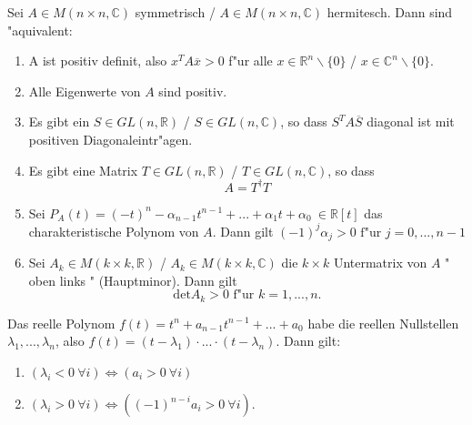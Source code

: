 \documentclass[8pt, a4paper, twocolumn, landscape]{article}
\newcommand{\comment}[1]{}
\begin{document}
\begin{theorem}
Sei $A \in M (n \times n, \mathbb{C})$ symmetrisch /  $A \in M (n \times n, \mathbb{C})$ hermitesch. Dann sind "aquivalent:
\begin{enumerate}
\item A ist positiv definit, also $x^TA\overline{x} > 0$ f"ur alle $x \in \mathbb{R}^n \backslash \{0\}$ /  $x \in \mathbb{C}^n\backslash \{0\}$.
\item Alle Eigenwerte von $A$ sind positiv.
\item Es gibt ein $S \in GL(n, \mathbb{R})$ / $S \in GL(n, \mathbb{C})$, so dass $S^TA\overline{S}$ diagonal ist mit positiven Diagonaleintr"agen.
\item Es gibt eine Matrix $T \in GL(n, \mathbb{R})$ / $T \in GL(n, \mathbb{C})$, so dass
$$
A = T^\dagger T
$$
\item Sei $P_A(t) = (-t)^n - \alpha_{n-1}t^{n-1} + ... + \alpha_1 t + \alpha_0 \ \in \mathbb{R} [t]$ das charakteristische Polynom von $A$. Dann gilt 
$
(-1)^j\alpha_j > 0 \text{ f"ur } j = 0, ..., n-1
$
\item Sei $A_k  \in M(k \times k, \mathbb{R})$ / $A_k  \in M(k \times k, \mathbb{C})$ die $k \times k$ Untermatrix von $A$ " oben links " (Hauptminor). Dann gilt
$$
\mathrm{det}A_k > 0 \text{ f"ur  } k = 1, ..., n.
$$
\end{enumerate}
\end{theorem}





\comment{
\begin{corollary}
Eine symmetrische Matrix $A \in M(n \times n; \mathbb{R})$ mit dem charakteristischen Polynom $P_A(t) = (-1)^n t^n + \alpha_{n-1}t^{n-1} + ... + \alpha_0$ ist genau dann positiv definit, wenn $(-1)^j \alpha_j > 0$ f"ur $j = 0, ..., n-1$. Das folgt aus folgender Vorzeichenregel.
\end{corollary}
}

\begin{lemma}
Das reelle Polynom $f(t) = t^n + a_{n-1}t^{n-1} + ... +a_0$ habe die reellen Nullstellen $\lambda_1, ..., \lambda_n$, also $f(t) = (t - \lambda_1) \cdot ... \cdot (t - \lambda_n)$. Dann gilt:
\begin{enumerate}
\item $(\lambda_i < 0 \ \forall i) \Leftrightarrow (a_i > 0 \ \forall i)$
\item $(\lambda_i > 0 \ \forall i) \Leftrightarrow ( (-1)^{n-i}a_i > 0 \ \forall i)$.
\end{enumerate}

\end{lemma}
\end{document}
